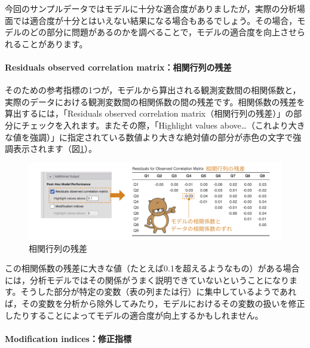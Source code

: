 \documentclass[
  12pt,
  a5jpaper,
  lualatex, ja=standard]{bxjsbook}
\begin{document}
今回のサンプルデータではモデルに十分な適合度がありましたが，実際の分析場面では適合度が十分とはいえない結果になる場合もあるでしょう。その場合，モデルのどの部分に問題があるのかを調べることで，モデルの適合度を向上させられることがあります。

\hypertarget{residuals-observed-correlation-matrixux76f8ux95a2ux884cux5217ux306eux6b8bux5dee}{%
\paragraph*{Residuals observed correlation matrix：相関行列の残差}\label{residuals-observed-correlation-matrixux76f8ux95a2ux884cux5217ux306eux6b8bux5dee}}

そのための参考指標の1つが，モデルから算出される観測変数間の相関係数と，実際のデータにおける観測変数間の相関係数の間の残差です。相関係数の残差を算出するには，「Residuals observed correlation matrix（相関行列の残差）」の部分にチェックを入れます。またその際，「Highlight values above\ldots（これより大きな値を強調）」に指定されている数値より大きな絶対値の部分が赤色の文字で強調表示されます（図\ref{fig:factor-cfa-residual-correlation}）。

\begin{figure}[!ht]

{\centering \includegraphics[width=1\linewidth]{images/factor/cfa-residual-correlation} 

}

\caption{相関行列の残差}\label{fig:factor-cfa-residual-correlation}
\end{figure}

この相関係数の残差に大きな値（たとえば0.1を超えるようなもの）がある場合には，分析モデルではその関係がうまく説明できていないということになります。そうした部分が特定の変数（表の列または行）に集中しているようであれば，その変数を分析から除外してみたり，モデルにおけるその変数の扱いを修正したりすることによってモデルの適合度が向上するかもしれません。

\hypertarget{modification-indicesux4feeux6b63ux6307ux6a19}{%
\paragraph*{Modification indices：修正指標}\label{modification-indicesux4feeux6b63ux6307ux6a19}}
\end{document}
